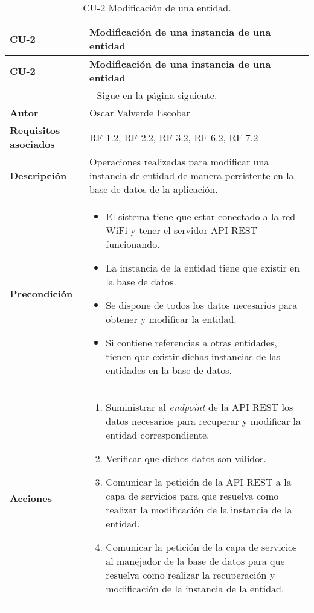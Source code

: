 \begin{longtable}{ p{} p{} }
    \caption{CU-2 Modificación de una entidad.}\\
    \hline
    \textbf{CU-2}    & \textbf{Modificación de una instancia de una entidad}\\
    \hline
    \endfirsthead
    \hline
    \textbf{CU-2}    & \textbf{Modificación de una instancia de una entidad}\\
    \hline
    \endhead
    \hline
    \multicolumn{2}{c}{Sigue en la página siguiente.}
    \endfoot
    \hline
    \endlastfoot
    
    \textbf{Versión}              & 1.0    \\
    \textbf{Autor}                & Oscar Valverde Escobar \\
    \textbf{Requisitos asociados} & RF-1.2, RF-2.2, RF-3.2, RF-6.2, RF-7.2\\
    \textbf{Descripción}          & Operaciones realizadas para modificar una instancia de entidad de manera persistente en la base de datos de la aplicación.\\
    \textbf{Precondición}         & 
    \begin{itemize}
        \item El sistema tiene que estar conectado a la red WiFi y tener el servidor API REST funcionando. 
        \item La instancia de la entidad tiene que existir en la base de datos. 
        \item Se dispone de todos los datos necesarios para obtener y modificar la entidad.
        \item Si contiene referencias a otras entidades, tienen que existir dichas instancias de las entidades en la base de datos.
    \end{itemize}\\
    \textbf{Acciones}             &
    \begin{enumerate}
        \def\labelenumi{\arabic{enumi}.}
        \tightlist
        \item Suministrar al \textit{endpoint} de la API REST los datos necesarios para recuperar y modificar la entidad correspondiente.
        \item Verificar que dichos datos son válidos.
        \item Comunicar la petición de la API REST a la capa de servicios para que resuelva como realizar la modificación de la instancia de la entidad.
        \item Comunicar la petición de la capa de servicios al manejador de la base de datos para que resuelva como realizar la recuperación y modificación de la instancia de la entidad.

\end{enumerate}
\end{longtable}
